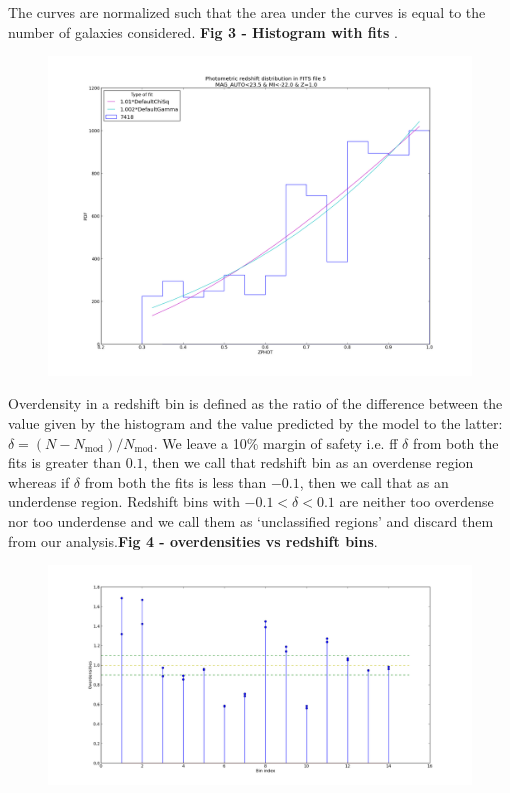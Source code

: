 \documentclass[twocolumn,useAMS,usenatbib]{mn2e}
\begin{document}
The curves are normalized such that the area under the curves is equal to the number of galaxies considered.
{\bf Fig 3 - Histogram with fits }. \\
\begin{figure}
 \centering
  \includegraphics[width=\columnwidth]{fig3}
  \label{fig:fig3}
  \caption{}
\end{figure}

Overdensity in a redshift bin is defined as the ratio of the difference between the value given by the histogram and the value predicted by the model to the latter: $\delta=(N-N_{\text{mod}})/N_{\text{mod}}$. 
We leave a 10\% margin of safety i.e. ff $\delta$ from both the fits is greater than $0.1$, then we call that redshift bin as an
overdense region whereas if $\delta$ from both the fits is less than $-0.1$, then we call that as an underdense region. Redshift bins with $-0.1 < \delta < 0.1$ are neither too overdense
nor too underdense and we call them as `unclassified regions'  and discard them from our analysis.{\bf Fig 4 - overdensities vs redshift bins}.

\begin{figure}
 \centering
 \includegraphics[width=\columnwidth]{fig4}
 \label{fig:fig4}
 \caption{}
\end{figure}
\end{document}
